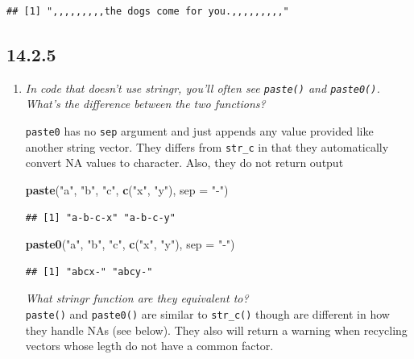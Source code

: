 \documentclass[]{book}
\newenvironment{Shaded}{\begin{snugshade}}{\end{snugshade}}
\newcommand{\DataTypeTok}[1]{\textcolor[rgb]{0.13,0.29,0.53}{#1}}
\newcommand{\KeywordTok}[1]{\textcolor[rgb]{0.13,0.29,0.53}{\textbf{#1}}}
\newcommand{\NormalTok}[1]{#1}
\newcommand{\StringTok}[1]{\textcolor[rgb]{0.31,0.60,0.02}{#1}}
\theoremstyle{definition}
\theoremstyle{definition}
\theoremstyle{definition}
\theoremstyle{remark}
\begin{document}
\begin{verbatim}
## [1] ",,,,,,,,,the dogs come for you.,,,,,,,,,"
\end{verbatim}

\hypertarget{section-40}{%
\subsection{14.2.5}\label{section-40}}

\begin{enumerate}
\def\labelenumi{\arabic{enumi}.}
\item
  \emph{In code that doesn't use stringr, you'll often see
  \texttt{paste()} and \texttt{paste0()}.} \emph{What's the difference
  between the two functions?}

  \texttt{paste0} has no \texttt{sep} argument and just appends any
  value provided like another string vector. They differs from
  \texttt{str\_c} in that they automatically convert NA values to
  character. Also, they do not return output

\begin{Shaded}
\begin{Highlighting}[]
\KeywordTok{paste}\NormalTok{(}\StringTok{"a"}\NormalTok{, }\StringTok{"b"}\NormalTok{, }\StringTok{"c"}\NormalTok{, }\KeywordTok{c}\NormalTok{(}\StringTok{"x"}\NormalTok{, }\StringTok{"y"}\NormalTok{), }\DataTypeTok{sep =} \StringTok{"-"}\NormalTok{)}
\end{Highlighting}
\end{Shaded}

\begin{verbatim}
## [1] "a-b-c-x" "a-b-c-y"
\end{verbatim}

\begin{Shaded}
\begin{Highlighting}[]
\KeywordTok{paste0}\NormalTok{(}\StringTok{"a"}\NormalTok{, }\StringTok{"b"}\NormalTok{, }\StringTok{"c"}\NormalTok{, }\KeywordTok{c}\NormalTok{(}\StringTok{"x"}\NormalTok{, }\StringTok{"y"}\NormalTok{), }\DataTypeTok{sep =} \StringTok{"-"}\NormalTok{)}
\end{Highlighting}
\end{Shaded}

\begin{verbatim}
## [1] "abcx-" "abcy-"
\end{verbatim}

  \emph{What stringr function are they equivalent to?}\\
  \texttt{paste()} and \texttt{paste0()} are similar to
  \texttt{str\_c()} though are different in how they handle NAs (see
  below). They also will return a warning when recycling vectors whose
  legth do not have a common factor.


\end{enumerate}
\end{document}
